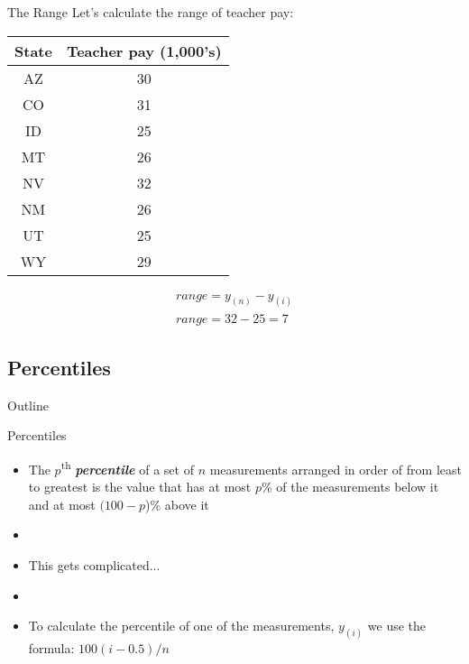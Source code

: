 \documentclass[xcolor=dvipsnames]{beamer}
\begin{document}
\begin{frame}{The Range}
Let's calculate the range of teacher pay:
	\begin{center}
		\begin{tabular}{|c|c|}
			\hline 
			\textbf{State} & \textbf{Teacher pay (1,000's)} \\ 
			\hline \hline
			AZ & 30 \\ \hline 
			CO &  31 \\ \hline 
			ID & 25  \\  \hline 
			MT &  26 \\ \hline 
			NV & 32 \\ \hline 
			NM &  26 \\ \hline 
			UT &  25 \\ \hline 
			WY &  29 \\ \hline 
		\end{tabular} 
	\end{center}
	\begin{gather*}
		range = y_{(n)} - y_{(i)} \\
		range = 32 - 25 = 7
	\end{gather*}
\end{frame}

\subsection{Percentiles}
\begin{frame}{Outline}
	\tableofcontents[currentsection,subsectionstyle=show/shaded/hide]
\end{frame}

\begin{frame}{Percentiles}
	\begin{itemize}
		\item The $p$\textsuperscript{th} \textbf{\emph{percentile}} of a set of $n$ measurements arranged in order of from least to greatest is the value that has at most $p$\% of the measurements below it and at most $(100 - p$)\% above it
		\item[]
		\item This gets complicated...
		\item[]
		\item To calculate the percentile of one of the measurements, $y_{(i)}$ we use the formula: $100(i - 0.5)/n$
	\end{itemize}
\end{frame}
\end{document}
